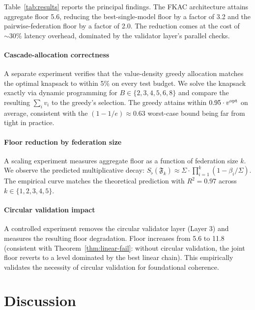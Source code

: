 \documentclass[11pt,twocolumn,a4paper]{article}
\theoremstyle{definition}
\theoremstyle{remark}
\newcommand{\Federation}{\mathfrak{F}}
\newcommand{\Sigmax}{\Sigma}
\newcommand{\Sfloor}{S_{\flat}}
\begin{document}
Table~\ref{tab:results} reports the principal findings. The FKAC architecture attains aggregate floor 5.6, reducing the best-single-model floor by a factor of 3.2 and the pairwise-federation floor by a factor of 2.0. The reduction comes at the cost of $\sim 30\%$ latency overhead, dominated by the validator layer's parallel checks.

\subsection{Cascade-allocation correctness}

A separate experiment verifies that the value-density greedy allocation matches the optimal knapsack to within 5\% on every test budget. We solve the knapsack exactly via dynamic programming for $B \in \{2, 3, 4, 5, 6, 8\}$ and compare the resulting $\sum_i v_i$ to the greedy's selection. The greedy attains within $0.95 \cdot v^{\rm opt}$ on average, consistent with the $(1-1/e) \approx 0.63$ worst-case bound being far from tight in practice.

\subsection{Floor reduction by federation size}

A scaling experiment measures aggregate floor as a function of federation size $k$. We observe the predicted multiplicative decay: $\Sfloor(\Federation_k) \approx \Sigmax \cdot \prod_{i=1}^k (1 - \beta_i/\Sigmax)$. The empirical curve matches the theoretical prediction with $R^2 = 0.97$ across $k \in \{1, 2, 3, 4, 5\}$.

\subsection{Circular validation impact}

A controlled experiment removes the circular validator layer (Layer 3) and measures the resulting floor degradation. Floor increases from 5.6 to 11.8 (consistent with Theorem~\ref{thm:linear-fail}: without circular validation, the joint floor reverts to a level dominated by the best linear chain). This empirically validates the necessity of circular validation for foundational coherence.


\part{Discussion}
\end{document}
